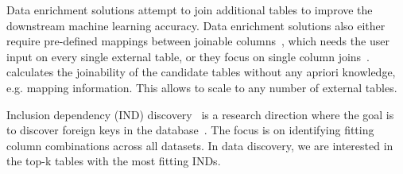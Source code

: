 Data enrichment solutions attempt to join additional tables to improve the downstream machine learning accuracy. Data enrichment solutions also either require pre-defined mappings between joinable columns~\cite{chepurko13arda, kumar2016join}, which needs the user input on every single external table, or they focus on single column joins~\cite{zhu2019josie, xiao2009top, eberius2015top, das2012finding, esmailoghli2021cocoa}. \system calculates the joinability of the candidate tables without any apriori knowledge, e.g. mapping information. This allows \system to scale to any number of external tables.

Inclusion dependency (IND) discovery~\cite{de2009unary, papenbrock2015divide, koeller2003discovery} is a research direction where the goal is to discover foreign keys in the database~\cite{papenbrock2015divide}. The focus is on identifying fitting column combinations across all datasets. In data discovery, we are interested in the top-k tables with the most fitting INDs.